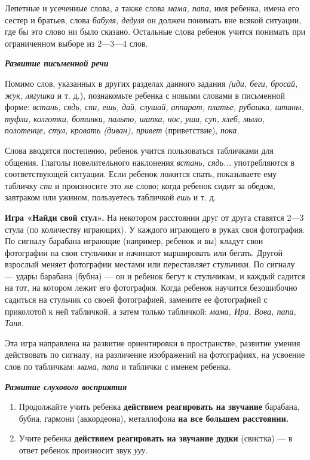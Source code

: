 \documentclass[a5paper]{book}
\renewcommand{\emph}[1]{\textit{#1}}
\begin{document}
Лепетные и усеченные слова, а также слова \emph{мама, папа,} имя
ребенка, имена его сестер и братьев, слова \emph{бабуля, дедуля} он
должен понимать вне всякой ситуации, где бы это слово ни было сказано.
Остальные слова ребенок учится понимать при ограниченном выборе из
2---3---4 слов.

\emph{\textbf{Развитие письменной речи}}

Помимо слов, указанных в других разделах данного задания \emph{(иди,
беги, бросай, жук, лягушка} и т. д.), познакомьте ребенка с новыми
словами в письменной форме: \emph{встань, сядь, спи, ешь, дай, слушай,
аппарат, платье, рубашка, штаны, туфли, колготки, ботинки, пальто,
шапка, нос, уши, суп, хлеб, мыло, полотенце, стул, кровать (диван),
привет} (приветствие), \emph{пока.}

Слова вводятся постепенно, ребенок учится пользоваться табличками для
общения. Глаголы повелительного наклонения \emph{встань, сядь...}
употребляются в соответствующей ситуации. Если ребенок ложится спать,
показываете ему табличку \emph{спи} и произносите это же слово; когда
ребенок сидит за обедом, завтраком или ужином, пользуетесь табличкой
\emph{ешь} и т. д.

\textbf{Игра «Найди свой стул».} На некотором расстоянии друг от друга
ставятся 2---3 стула (по количеству играющих). У каждого играющего в
руках своя фотография. По сигналу барабана играющие (например, ребенок и
вы) кладут свои фотографии на свои стульчики и начинают маршировать или
бегать. Другой взрослый меняет фотографии местами или переставляет
стульчики. По сигналу --- удары барабана (бубна) --- он и ребенок бегут
к стульчикам, и каждый садится на тот, на котором лежит его фотография.
Когда ребенок научится безошибочно садиться на стульчик со своей
фотографией, замените ее фотографией с приколотой к ней табличкой, а
затем только табличкой: \emph{мама, Ира, Вова, папа, Таня.}

Эта игра направлена на развитие ориентировки в пространстве, развитие
умения действовать по сигналу, на различение изображений на фотографиях,
на усвоение слов по табличкам: \emph{мама, папа} и таблички с именем
ребенка.

\emph{\textbf{Развитие слухового восприятия}}


\begin{enumerate}
\def\labelenumi{\arabic{enumi}.}
\item
  
  Продолжайте учить ребенка \textbf{действием реагировать на звучание}
  барабана, бубна, гармони (аккордеона), металлофона \textbf{на все
  большем расстоянии.}
  
\item
  
  Учите ребенка \textbf{действием реагировать на звучание дудки}
  (свистка) --- в ответ ребенок произносит звук \emph{ууу.}
  
\end{enumerate}
\end{document}
